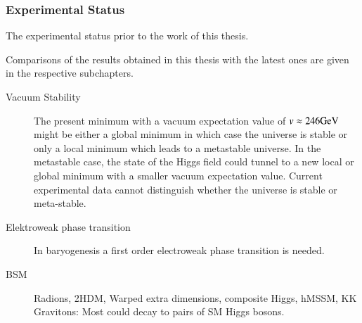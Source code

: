 \subsubsection{Experimental Status}%

The experimental status prior to the work of this thesis.

Comparisons of the results obtained in this thesis with the latest ones are
given in the respective subchapters.





\clearpage
{}


\begin{description}

\item[Vacuum Stability] The present minimum with a vacuum expectation
  value of $v \approx \si{246}{\ensuremath{\text{GeV}}}$ might be either a global minimum
  in which case the universe is stable or only a local minimum which
  leads to a metastable universe. In the metastable case, the state of
  the Higgs field could tunnel to a new local or global minimum with a
  smaller vacuum expectation value. Current experimental data cannot
  distinguish whether the universe is stable or
  meta-stable.

\item[Elektroweak phase transition] In baryogenesis a first order
  electroweak phase transition is needed.

\item[BSM] Radions, 2HDM, Warped extra dimensions, composite Higgs, hMSSM, KK
  Gravitons: Most could decay to pairs of SM Higgs bosons.

\end{description}






